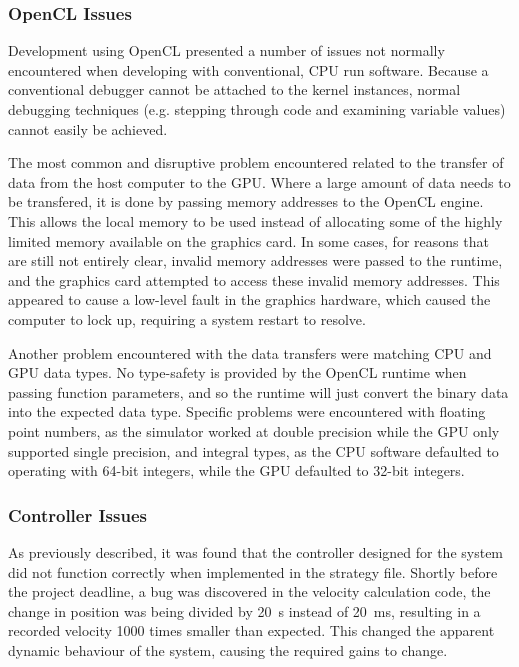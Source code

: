 \documentclass[10pt]{article} \usepackage[a4paper]{geometry}
\begin{document}
\subsubsection{OpenCL Issues}

Development using OpenCL presented a number of issues not normally encountered
when developing with conventional, \ac{CPU} run software.  Because a
conventional debugger cannot be attached to the kernel instances, normal
debugging techniques (e.g. stepping through code and examining variable values)
cannot easily be achieved.

The most common and disruptive problem encountered related to the transfer of
data from the host computer to the \ac{GPU}.  Where a large amount of data needs
to be transfered, it is done by passing memory addresses to the OpenCL engine. 
This allows the local memory to be used instead of allocating some of the highly
limited memory available on the graphics card.  In some cases, for reasons that
are still not entirely clear, invalid memory addresses were passed to the
runtime, and the graphics card attempted to access these invalid memory
addresses.  This appeared to cause a low-level fault in the graphics hardware,
which caused the computer to lock up, requiring a system restart to resolve.

Another problem encountered with the data transfers were matching \ac{CPU} and
\ac{GPU} data types.  No type-safety is provided by the OpenCL runtime when
passing function parameters, and so the runtime will just convert the binary
data into the expected data type.  Specific problems were encountered with
floating point numbers, as the simulator worked at double precision while the
\ac{GPU} only supported single precision, and integral types, as the \ac{CPU}
software defaulted to operating with 64-bit integers, while the \ac{GPU}
defaulted to 32-bit integers.

\subsubsection{Controller Issues}

As previously described, it was found that the controller designed for the
system did not function correctly when implemented in the strategy file. 
Shortly before the project deadline, a bug was discovered in the velocity
calculation code, the change in position was being divided by \SI{20}{\second}
instead of \SI{20}{\milli\second}, resulting in a recorded velocity 1000 times
smaller than expected.  This changed the apparent dynamic behaviour of the
system, causing the required gains to change.
\end{document}
